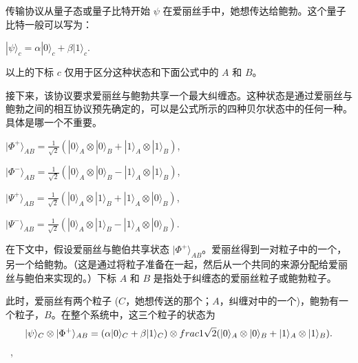 传输协议从量子态或量子比特开始 $\psi$ 在爱丽丝手中，她想传达给鲍勃。这个量子比特一般可以写为：

$|\psi\rangle_c = \alpha|0\rangle_c + \beta|1\rangle_c$.

以上的下标 $c$ 仅用于区分这种状态和下面公式中的 $A$ 和 $B$。

接下来，该协议要求爱丽丝与鲍勃共享一个最大纠缠态。这种状态是通过爱丽丝与鲍勃之间的相互协议预先确定的，可以是公式所示的四种贝尔状态中的任何一种。具体是哪一个不重要。

$|\Phi^+\rangle_{AB} = \frac{1}{\sqrt{2}} (|0\rangle_A \otimes |0\rangle_B + |1\rangle_A \otimes |1\rangle_B)$,

$|\Phi^-\rangle_{AB} = \frac{1}{\sqrt{2}} (|0\rangle_A \otimes |0\rangle_B - |1\rangle_A \otimes |1\rangle_B)$,

$|\Psi^+\rangle_{AB} = \frac{1}{\sqrt{2}} (|0\rangle_A \otimes |1\rangle_B + |1\rangle_A \otimes |0\rangle_B)$,

$|\Psi^-\rangle_{AB} = \frac{1}{\sqrt{2}} (|0\rangle_A \otimes |1\rangle_B - |1\rangle_A \otimes |0\rangle_B)$.

在下文中，假设爱丽丝与鲍伯共享状态 $\lvert \Phi^{+} \rangle_{AB}$。爱丽丝得到一对粒子中的一个，另一个给鲍勃。（这是通过将粒子准备在一起，然后从一个共同的来源分配给爱丽丝与鲍伯来实现的。）下标 $A$ 和 $B$ 是指处于纠缠态的爱丽丝粒子或鲍勃粒子。

此时，爱丽丝有两个粒子 ($C$，她想传送的那个；$A$，纠缠对中的一个)，鲍勃有一个粒子，$B$。在整个系统中，这三个粒子的状态为
$$\lvert \psi \rangle_{C} \otimes \lvert \Phi^{+} \rangle_{AB} = (\alpha \lvert 0 \rangle_{C} + \beta \lvert 1 \rangle_{C}) \otimes \\frac{1}{\sqrt{2}} (\lvert 0 \rangle_{A} \otimes \lvert 0 \rangle_{B} + \lvert 1 \rangle_{A} \otimes \lvert 1 \rangle_{B}).$$~,

